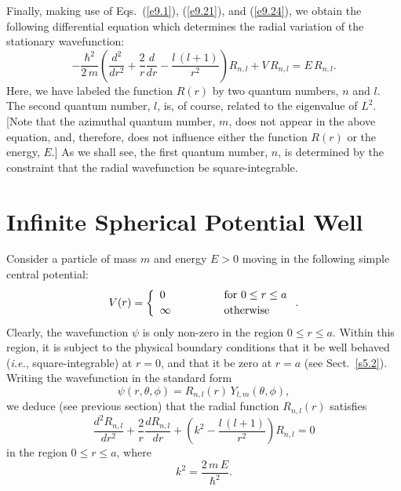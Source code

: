 Finally, making use of Eqs.~(\ref{e9.1}), (\ref{e9.21}), and (\ref{e9.24}),
we obtain the following differential equation which determines the radial variation  of the stationary wavefunction:
\begin{equation}
-\frac{\hbar^2}{2\,m}\left(\frac{d^2}{d r^2}
+ \frac{2}{r}\frac{d}{d r}- \frac{l\,(l+1)}{r^2}\right)R_{n,l}
+V\,R_{n,l} = E\,R_{n,l}.
\end{equation}
Here, we have labeled the function $R(r)$ by two quantum numbers,
$n$ and $l$. The second  quantum number, $l$, is, of course, related to the eigenvalue of $L^2$. [Note that
the azimuthal quantum number, $m$, does not appear in the above equation, 
and, therefore, does not influence either the function $R(r)$ or the energy, $E$.] As we shall see, the first quantum number, $n$, is determined by the constraint that the radial wavefunction be square-integrable.

\section{Infinite Spherical Potential Well}\label{rwell}
Consider a particle of mass $m$ and energy $E>0$ moving in the
following simple central potential:
\begin{equation}
V(r) = \left\{\begin{array}{lcl}
0&\mbox{\hspace{1cm}}&\mbox{for $0\leq r\leq a$}\\[0.5ex]
\infty&&\mbox{otherwise}
\end{array}\right..
\end{equation}
Clearly, the wavefunction $\psi$ is only non-zero in the region $0\leq r \leq a$.
Within this region, it is subject to the physical boundary conditions that it be well behaved ({\em i.e.},
square-integrable) at $r=0$, and that it be zero at $r=a$ (see Sect.~\ref{s5.2}).
Writing the wavefunction in the standard form
\begin{equation}\label{e9.27}
\psi(r,\theta,\phi) = R_{n,l}(r)\,Y_{l,m}(\theta,\phi),
\end{equation}
we deduce (see previous section) that the radial function $R_{n,l}(r)$ satisfies
\begin{equation}
\frac{d^2 R_{n,l}}{dr^2} + \frac{2}{r}\frac{dR_{n,l}}{dr} + \left(k^2
- \frac{l\,(l+1)}{r^2}\right) R_{n,l} = 0
\end{equation}
in the region $0\leq r \leq a$, where
\begin{equation}\label{e9.29}
k^2 = \frac{2\,m\,E}{\hbar^2}.
\end{equation}

